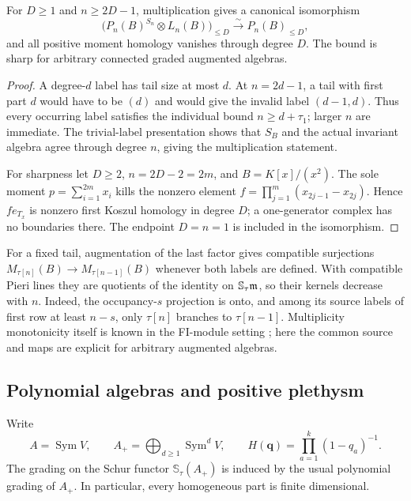 \begin{corollary}
\label{cor:universal-augmented-separation}
For $D\ge1$ and $n\ge2D-1$, multiplication gives a canonical isomorphism
\[
 \bigl(P_n(B)^{S_n}\otimes L_n(B)\bigr)_{\le D}
                     \xrightarrow{\sim}P_n(B)_{\le D},
\]
and all positive moment homology vanishes through degree $D$.
The bound is sharp for arbitrary connected graded augmented algebras.
\end{corollary}
\begin{proof}
A degree-$d$ label has tail size at most $d$. At $n=2d-1$, a tail
with first part $d$ would have to be $(d)$ and would give the invalid
label $(d-1,d)$. Thus every occurring label satisfies the individual
bound $n\ge d+\tau_1$; larger $n$ are immediate. The trivial-label
presentation shows that $S_B$ and the actual invariant algebra agree
through degree $n$, giving the multiplication statement.

For sharpness let $D\ge2$, $n=2D-2=2m$, and $B=K[x]/(x^2)$.
The sole moment $p=\sum_{i=1}^{2m}x_i$ kills the nonzero element
$f=\prod_{j=1}^m(x_{2j-1}-x_{2j})$. Hence $f e_{T_x}$ is nonzero
first Koszul homology in degree $D$; a one-generator complex has no
boundaries there. The endpoint $D=n=1$ is included in the isomorphism.
\end{proof}

For a fixed tail, augmentation of the last factor gives compatible
surjections $M_{\tau[n]}(B)\to M_{\tau[n-1]}(B)$ whenever both labels
are defined. With compatible Pieri lines they are quotients of the
identity on $\mathbb S_\tau\mathfrak m$, so their kernels decrease with
$n$. Indeed, the occupancy-$s$ projection is onto, and among its source
labels of first row at least $n-s$, only $\tau[n]$ branches to
$\tau[n-1]$. Multiplicity monotonicity itself is known in the FI-module
setting \cite[Lemma~2.1.1]{Borisov2026}; here the common source and maps
are explicit for arbitrary augmented algebras.



\subsection{Polynomial algebras and positive plethysm}

Write
\[
 A=\operatorname{Sym}V,
 \qquad A_+=\bigoplus_{d\ge1}\operatorname{Sym}^dV,
 \qquad H(\mathbf q)=\prod_{a=1}^k(1-q_a)^{-1}.
\]
The grading on the Schur functor $\mathbb S_\tau(A_+)$
is induced by the usual polynomial grading of $A_+$.
In particular, every homogeneous part is finite dimensional.

